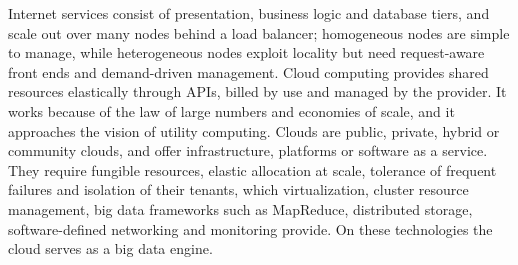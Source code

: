 \documentclass[../main.tex]{subfiles}
\begin{document}
\begin{keypoint}
  Internet services consist of presentation, business logic and database
  tiers, and scale out over many nodes behind a load balancer; homogeneous
  nodes are simple to manage, while heterogeneous nodes exploit locality but
  need request-aware front ends and demand-driven management.  Cloud
  computing provides shared resources elastically through APIs, billed by
  use and managed by the provider.  It works because of the law of large
  numbers and economies of scale, and it approaches the vision of utility
  computing.  Clouds are public, private, hybrid or community clouds, and
  offer infrastructure, platforms or software as a service.  They require
  fungible resources, elastic allocation at scale, tolerance of frequent
  failures and isolation of their tenants, which virtualization, cluster
  resource management, big data frameworks such as MapReduce, distributed
  storage, software-defined networking and monitoring provide.  On these
  technologies the cloud serves as a big data engine.
\end{keypoint}
\end{document}
